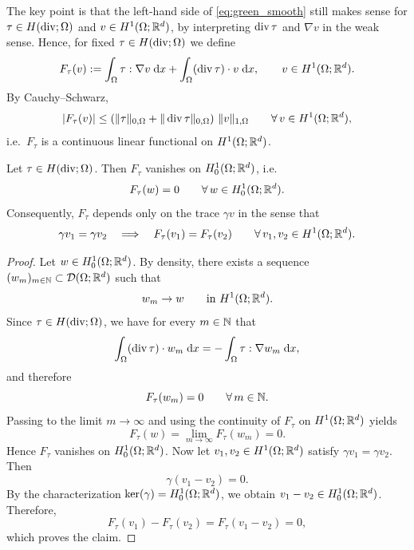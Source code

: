The key point is that the left-hand side of \eqref{eq:green_smooth} still makes sense for $\tau\in H(\diver;\Omega)$ and $v\in H^1(\Omega;{\mathbb R}^d)$, by interpreting $\diver\tau$ and $\nabla v$ in the weak sense. Hence, for fixed $\tau\in H(\diver;\Omega)$ we define
\begin{equation}\label{eq:Ftau}
	F_\tau(v)
	:=
	\int_\Omega \tau:\nabla v\;\dx + \int_\Omega (\diver\tau)\cdot v\;\dx,
	\qquad v\in H^1(\Omega;\R^d).
\end{equation}
By Cauchy--Schwarz,
\begin{equation*}
	|F_\tau(v)|
	\le
	\left(\|\tau\|_{0,\Omega}+\|\diver\tau\|_{0,\Omega}\right)\,\|v\|_{1,\Omega}
	\qquad\forall\,v\in H^1(\Omega;\R^d),
\end{equation*}
i.e.\ $F_\tau$ is a continuous linear functional on $H^1(\Omega;{\mathbb R}^d)$.

\begin{proposition}\label{pr:Ftau_depends_on_trace}
	Let $\tau\in H(\diver;\Omega)$. Then $F_\tau$ vanishes on $H^1_0(\Omega;{\mathbb R}^d)$, i.e.
	\begin{equation*}
		F_\tau(w)=0
		\qquad\forall\,w\in H^1_0(\Omega;{\mathbb R}^d).
	\end{equation*}
	Consequently, $F_\tau$ depends only on the trace $\gamma v$ in the sense that
	\begin{equation*}
		\gamma v_1=\gamma v_2
		\quad\Longrightarrow\quad
		F_\tau(v_1)=F_\tau(v_2)
		\qquad\forall\,v_1,v_2\in H^1(\Omega;{\mathbb R}^d).
	\end{equation*}
\end{proposition}
\begin{proof}
	Let $w\in H^1_0(\Omega;{\mathbb R}^d)$. By density, there exists a sequence $(w_m)_{m\in{\mathbb N}}\subset {\mathcal D}(\Omega;{\mathbb R}^d)$ such that
	\begin{equation*}
		w_m\to w
		\qquad\text{in }H^1(\Omega;{\mathbb R}^d).
	\end{equation*}
	Since $\tau\in H(\diver;\Omega)$, we have for every $m\in{\mathbb N}$ that
	\begin{equation*}
		\int_\Omega (\diver\tau)\cdot w_m\;\dx
		=
		-\int_\Omega \tau:\nabla w_m\;\dx,
	\end{equation*}
	and therefore
	\begin{equation*}
		F_\tau(w_m)=0
		\qquad\forall\,m\in{\mathbb N}.
	\end{equation*}
	Passing to the limit $m\to\infty$ and using the continuity of $F_\tau$ on $H^1(\Omega;{\mathbb R}^d)$ yields
	\begin{equation*}
		F_\tau(w)=\lim_{m\to\infty}F_\tau(w_m)=0.
	\end{equation*}
	Hence $F_\tau$ vanishes on $H^1_0(\Omega;{\mathbb R}^d)$. Now let $v_1,v_2\in H^1(\Omega;{\mathbb R}^d)$ satisfy $\gamma v_1=\gamma v_2$. Then
	\begin{equation*}
		\gamma(v_1-v_2)=0.
	\end{equation*}
	By the characterization $\ker(\gamma)=H^1_0(\Omega;{\mathbb R}^d)$, we obtain $v_1-v_2\in H^1_0(\Omega;{\mathbb R}^d)$. Therefore,
	\begin{equation*}
		F_\tau(v_1)-F_\tau(v_2)
		=
		F_\tau(v_1-v_2)
		=
		0,
	\end{equation*}
	which proves the claim.
\end{proof}

